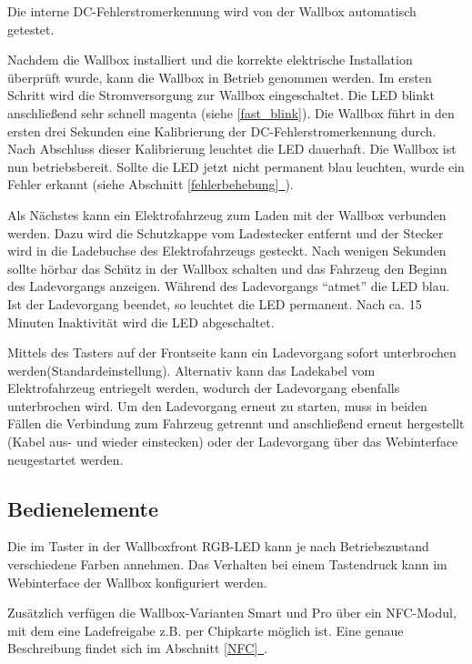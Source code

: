\documentclass[a4paper,10pt]{article}
\newcommand*{\fullref}[1]{Abschnitt \hyperref[{#1}]{\ref*{#1}~\nameref*{#1}}}
\begin{document}
\begin{multicols*}{2}
    Die interne DC-Fehlerstromerkennung wird von der Wallbox automatisch getestet.

    Nachdem die Wallbox installiert
    und die korrekte elektrische Installation überprüft wurde, kann die Wallbox in
    Betrieb genommen werden.
    Im ersten Schritt wird die Stromversorgung zur Wallbox eingeschaltet. Die
    LED blinkt anschließend sehr schnell magenta (siehe \ref{fast_blink}). Die Wallbox führt
    in den ersten drei Sekunden eine Kalibrierung der
    DC-Fehlerstromerkennung durch. Nach Abschluss dieser Kalibrierung
    leuchtet die LED dauerhaft. Die Wallbox ist nun betriebsbereit. Sollte die LED jetzt
    nicht permanent blau leuchten, wurde ein Fehler erkannt (siehe \fullref{fehlerbehebung}).

    Als Nächstes kann ein Elektrofahrzeug zum Laden mit der Wallbox verbunden
    werden. Dazu wird die Schutzkappe vom Ladestecker entfernt und der Stecker
	wird in die Ladebuchse des Elektrofahrzeugs gesteckt. Nach wenigen Sekunden sollte hörbar
    das Schütz in der Wallbox schalten und das Fahrzeug den Beginn
    des Ladevorgangs anzeigen. Während des Ladevorgangs \enquote{atmet} die LED blau.
    Ist der Ladevorgang beendet, so leuchtet die LED permanent. Nach ca.
    15 Minuten Inaktivität wird die LED abgeschaltet.

	Mittels des Tasters auf der Frontseite kann ein Ladevorgang sofort unterbrochen werden(Standardeinstellung). Alternativ kann das Ladekabel vom Elektrofahrzeug entriegelt werden,
    wodurch der Ladevorgang ebenfalls unterbrochen wird. Um den Ladevorgang erneut
    zu starten, muss in beiden Fällen die Verbindung zum Fahrzeug getrennt und
    anschließend erneut hergestellt (Kabel aus- und wieder einstecken) oder der Ladevorgang über das Webinterface neugestartet werden.

    \vspace{-0.1cm}
    \subsection{Bedienelemente}\label{lockswitch}
	Die im Taster in der Wallboxfront RGB-LED kann je nach Betriebszustand
	verschiedene Farben annehmen.
	Das Verhalten bei einem Tastendruck kann im Webinterface der Wallbox konfiguriert werden.

    Zusätzlich verfügen die Wallbox-Varianten Smart und Pro über ein NFC-Modul,
	mit dem eine Ladefreigabe z.B. per Chipkarte möglich ist. Eine
    genaue Beschreibung findet sich im \fullref{NFC}.


\end{multicols*}
\end{document}
